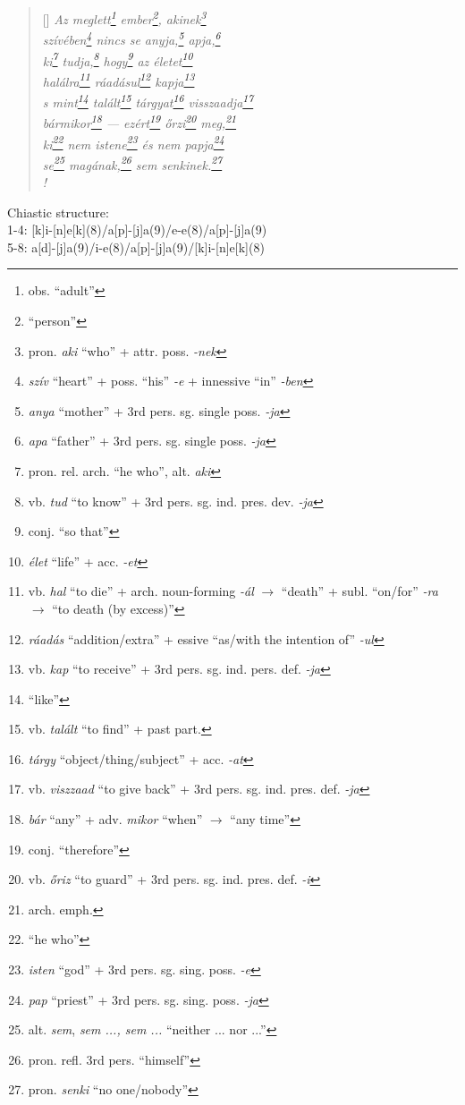 \documentclass[a4paper,12pt,twoside,final]{book}
\begin{document}
\begin{verse}[\versewidth]
  \it
  Az meglett\footnote{obs. ``adult''} ember\footnote{``person''},
  akinek\footnote{pron. \emph{aki} ``who'' + attr. poss. \emph{-nek}} \\
  szívében\footnote{\emph{szív} ``heart'' + poss. ``his'' \emph{-e} +
  innessive ``in'' \emph{-ben}} nincs se anyja,\footnote{\emph{anya}
  ``mother'' + 3rd pers. sg. single poss. \emph{-ja}}
  apja,\footnote{\emph{apa} ``father'' + 3rd pers. sg. single
  poss. \emph{-ja}} \\
  ki\footnote{pron. rel. arch. ``he who'', alt. \emph{aki}}
  tudja,\footnote{vb. \emph{tud} ``to know'' + 3rd
  pers. sg. ind. pres. dev. \emph{-ja}}
  hogy\footnote{conj. ``so that''} az életet\footnote{\emph{élet}
  ``life'' + acc. \emph{-et}} \\
  halálra\footnote{vb. \emph{hal} ``to die'' + arch. noun-forming
  \emph{-ál} $\rightarrow$ ``death'' + subl. ``on/for'' \emph{-ra}
  $\rightarrow$ ``to death (by excess)''}
  ráadásul\footnote{\emph{ráadás} ``addition/extra'' + essive
  ``as/with the intention of'' \emph{-ul}}
  kapja\footnote{vb. \emph{kap} ``to receive'' + 3rd
  pers. sg. ind. pers. def. \emph{-ja}} \\
  s mint\footnote{``like''} talált\footnote{vb. \emph{talált} ``to
  find'' + past part.} tárgyat\footnote{\emph{tárgy}
  ``object/thing/subject'' + acc. \emph{-at}}
  visszaadja\footnote{vb. \emph{viszzaad} ``to give back'' + 3rd
  pers. sg. ind. pres. def. \emph{-ja}} \\
  bármikor\footnote{\emph{bár} ``any'' + adv. \emph{mikor} ``when''
  $\rightarrow$ ``any time''} --- ezért\footnote{conj. ``therefore''}
  őrzi\footnote{vb. \emph{őriz} ``to guard'' + 3rd
  pers. sg. ind. pres. def. \emph{-i}} meg,\footnote{arch. emph.} \\
  ki\footnote{``he who''} nem istene\footnote{\emph{isten} ``god'' +
  3rd pers. sg. sing. poss. \emph{-e}} és nem
  papja\footnote{\emph{pap} ``priest'' + 3rd
  pers. sg. sing. poss. \emph{-ja}} \\
  se\footnote{alt. \emph{sem}, \emph{sem ..., sem ...}  ``neither
  ... nor ...''} magának,\footnote{pron. refl. 3rd pers. ``himself''}
  sem senkinek.\footnote{pron. \emph{senki} ``no one/nobody''} \\!
\end{verse}

\noindent Chiastic structure: \\
1-4: [k]i-[n]e[k](8)/a[p]-[j]a(9)/e-e(8)/a[p]-[j]a(9)\\
5-8: a[d]-[j]a(9)/i-e(8)/a[p]-[j]a(9)/[k]i-[n]e[k](8)
\end{document}
